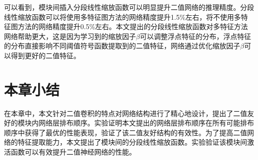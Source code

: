 可以看到，模块间插入分段线性缩放函数可以明显提升二值网络的推理精度。分段线性缩放函数可以将使用多特征图方法的网络精度提升1.5\%左右，将不使用多特征图方法的网络精度提升0.5\%左右。本文提出的分段线性缩放函数对多特征方法网络帮助更大，这是因为学习到的缩放因子$\beta$可以调整浮点特征的分布，浮点特征的分布直接影响不同阈值符号函数提取到的二值特征，网络通过优化缩放因子$\beta$可以得到更好的二值特征。

\section{本章小结}

在本章中，本文针对二值卷积的特点对网络结构进行了精心地设计，提出了二值友好的模块内网络层排布顺序。实验证明本文提出的网络层排布顺序在所有可能排布顺序中获得了最优的性能表现，验证了该二值友好结构的有效性。为了提高二值网络的特征提取能力，本文提出了模块间的分段线性缩放函数。实验验证该模块间激活函数可以有效提升二值神经网络的性能。